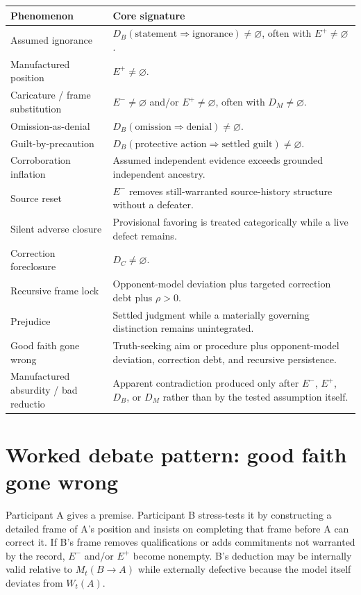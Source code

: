 \documentclass[11pt]{article}
\begin{document}
\begin{center}
\begin{tabular}{p{} p{}}
\hline
Phenomenon & Core signature \\
\hline
Assumed ignorance & $D_B(\text{statement}\Rightarrow\text{ignorance})\neq\varnothing$, often with $E^+\neq\varnothing$. \\
Manufactured position & $E^+\neq\varnothing$. \\
Caricature / frame substitution & $E^-\neq\varnothing$ and/or $E^+\neq\varnothing$, often with $D_M\neq\varnothing$. \\
Omission-as-denial & $D_B(\text{omission}\Rightarrow\text{denial})\neq\varnothing$. \\
Guilt-by-precaution & $D_B(\text{protective action}\Rightarrow\text{settled guilt})\neq\varnothing$. \\
Corroboration inflation & Assumed independent evidence exceeds grounded independent ancestry. \\
Source reset & $E^-$ removes still-warranted source-history structure without a defeater. \\
Silent adverse closure & Provisional favoring is treated categorically while a live defect remains. \\
Correction foreclosure & $D_C\neq\varnothing$. \\
Recursive frame lock & Opponent-model deviation plus targeted correction debt plus $\rho>0$. \\
Prejudice & Settled judgment while a materially governing distinction remains unintegrated. \\
Good faith gone wrong & Truth-seeking aim or procedure plus opponent-model deviation, correction debt, and recursive persistence. \\
Manufactured absurdity / bad reductio & Apparent contradiction produced only after $E^-$, $E^+$, $D_B$, or $D_M$ rather than by the tested assumption itself. \\
\hline
\end{tabular}
\end{center}

\section{Worked debate pattern: good faith gone wrong}
Participant A gives a premise. Participant B stress-tests it by constructing a detailed frame of A's position and insists on completing that frame before A can correct it. If B's frame removes qualifications or adds commitments not warranted by the record, $E^-$ and/or $E^+$ become nonempty. B's deduction may be internally valid relative to $M_t(B\to A)$ while externally defective because the model itself deviates from $W_t(A)$.
\end{document}
